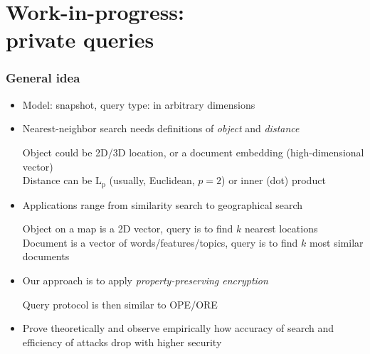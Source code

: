 \section{Work-in-progress: \\ private \knn{} queries}

	\begin{frame}[label={frame:knn}]

		\frametitle{General idea}

		\begin{itemize}
			\item<1->
				Model: \alert{snapshot}, query type: \alert{\knn{}} in arbitrary dimensions

			\item<2->
				Nearest-neighbor search needs definitions of \emph{object} and \emph{distance} \\
				\begin{small}
					Object could be 2D/3D location, or a document embedding (high-dimensional vector) \\
					Distance can be $\text{L}_\text{p}$ (usually, Euclidean, $p = 2$) or inner (dot) product
				\end{small}

			\item<3->
				Applications range from similarity search to geographical search \\
				\begin{small}
					Object on a map is a 2D vector, query is to find $k$ nearest locations \\
					Document is a vector of words/features/topics, query is to find $k$ most similar documents
				\end{small}

			\item<4->
				Our approach is to apply \emph{property-preserving encryption} \\
				\begin{small}
					Query protocol is then similar to OPE/ORE
				\end{small}

			\item<5->
				Prove theoretically and observe empirically how accuracy of search and efficiency of attacks drop with higher security \\
				\begin{small}
					\hyperlink{frame:appendix:dcpe}{}
					\hyperlink{frame:appendix:trec-faiss}{}
					\hyperlink{frame:appendix:knn-plot}{}
				\end{small}

		\end{itemize}

	\end{frame}
